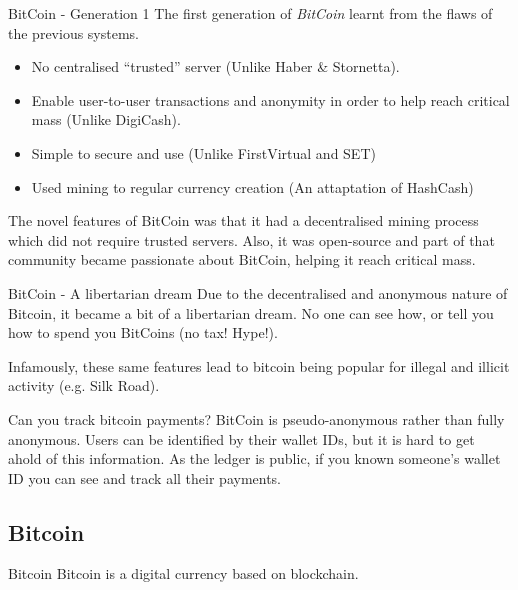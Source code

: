 \documentclass[11pt,a4paper]{article}
\begin{document}
  \begin{proposition}{BitCoin - Generation 1}
    The first generation of \textit{BitCoin} learnt from the flaws of the previous systems.
    \begin{itemize}
      \item No centralised ``trusted'' server (Unlike Haber \& Stornetta).
      \item Enable user-to-user transactions and anonymity in order to help reach critical mass (Unlike DigiCash).
      \item Simple to secure and use (Unlike FirstVirtual and SET)
      \item Used mining to regular currency creation (An attaptation of HashCash)
    \end{itemize}
    The novel features of BitCoin was that it had a decentralised mining process which did not require trusted servers. Also, it was open-source and part of that community became passionate about BitCoin, helping it reach critical mass.
  \end{proposition}

  \begin{remark}{BitCoin - A libertarian dream}
    Due to the decentralised and anonymous nature of Bitcoin, it became a bit of a libertarian dream. No one can see how, or tell you how to spend you BitCoins (no tax! Hype!).
    \par Infamously, these same features lead to bitcoin being popular for illegal and illicit activity (e.g. Silk Road).
  \end{remark}

  \begin{remark}{Can you track bitcoin payments?}
    BitCoin is pseudo-anonymous rather than fully anonymous. Users can be identified by their wallet IDs, but it is hard to get ahold of this information. As the ledger is public, if you known someone's wallet ID you can see and track all their payments.
  \end{remark}

\subsection{Bitcoin}

  \begin{definition}{Bitcoin}
    Bitcoin is a digital currency based on blockchain.
  \end{definition}
\end{document}
